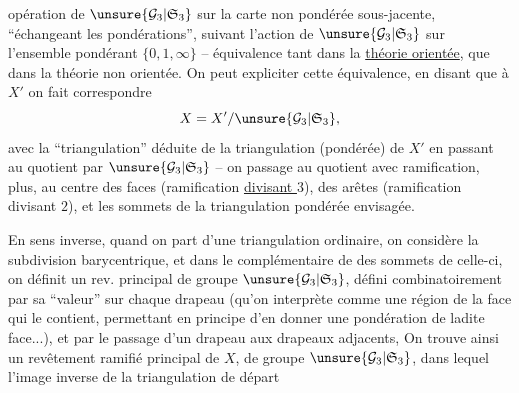 opération de $\unsure{\mathcal G_3|\mathfrak S_3}$ sur la carte non pondérée sous-jacente, ``échangeant les pondérations'', suivant l'action de $\unsure{\mathcal G_3|\mathfrak S_3}$ sur l'ensemble pondérant $\{0,1,\infty\}$ -- équivalence tant dans la \uline{théorie orientée}, que dans la théorie non orientée. On peut expliciter cette équivalence,  en disant que  à $X'$ on fait correspondre
\[
X=X'/\unsure{\mathcal G_3|\mathfrak S_3},
\]
avec la ``triangulation'' déduite de la triangulation (pondérée) de $X'$ en passant au quotient par $\unsure{\mathcal G_3|\mathfrak S_3}$ -- on  passage au quotient avec ramification,  plus, au centre des faces (ramification \uline{divisant $3$}), des arêtes (ramification divisant $2$), et les sommets de la triangulation pondérée envisagée.

En sens inverse, quand on part d'une triangulation ordinaire, on considère la subdivision barycentrique,  et dans le complémentaire de  des sommets de celle-ci, on définit un rev. principal  de groupe $\unsure{\mathcal G_3|\mathfrak S_3}$, défini combinatoirement par sa ``valeur'' sur chaque drapeau (qu'on interprète comme une région de la face qui le contient, permettant  en principe d'en donner une pondération de ladite face...), et par le passage d'un drapeau  aux drapeaux adjacents,  On trouve ainsi un revêtement ramifié principal  de $X$, de groupe $\unsure{\mathcal G_3|\mathfrak S_3}$,  dans lequel l'image inverse de la triangulation de départ
